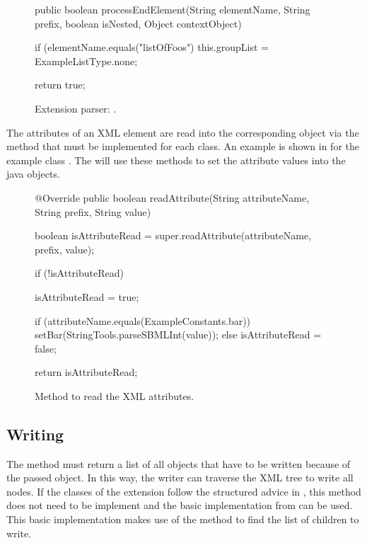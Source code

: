 \begin{figure}[htb]
  \begin{example}
public boolean processEndElement(String elementName, String prefix,
  boolean isNested, Object contextObject) {

  if (elementName.equals("listOfFoos") {
    this.groupList = ExampleListType.none;
  }

  return true;
}\end{example}
  \caption{Extension parser: .}
  \label{lst:ModelExtParserEndElement}
\end{figure}

The attributes of an XML element are read into the corresponding object via
the  method that must be implemented for each class.
An example is shown in  for the example class
. The  will use these methods to set
the attribute values into the java objects.

\begin{figure}[htb]
  \begin{example}
@Override
public boolean readAttribute(String attributeName, String prefix, String value) {

  boolean isAttributeRead = super.readAttribute(attributeName, prefix, value);

  if (!isAttributeRead) {
    isAttributeRead = true;

    if (attributeName.equals(ExampleConstants.bar)) {
      setBar(StringTools.parseSBMLInt(value));
    } else {
      isAttributeRead = false;
    }
  }

  return isAttributeRead;
}\end{example}
  \caption{Method to read the XML attributes.}
  \label{lst:ModelExtReadAttributes}
\end{figure}


\subsection{Writing}

The method   must return a list of all
objects that have to be written because of the passed object.  In this way,
the writer can traverse the XML tree to write all nodes. If the classes of the
extension follow the structured advice in , this
method does not need to be implement and the basic implementation from 
can be used. This basic implementation makes use of the method 
to find the list of children to write.


